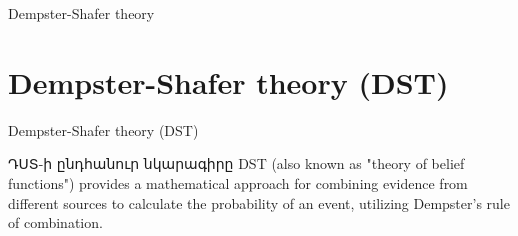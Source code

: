 \documentclass[aspectratio=169]{beamer}
\begin{document}

\begin{frame}
    \begin{center}
        \Huge Dempster-Shafer theory
    \end{center}
\end{frame}

\section{Dempster-Shafer theory (DST)}
\begin{frame}{Dempster-Shafer theory (DST)}
    \begin{block}{ԴՍՏ-ի ընդհանուր նկարագիրը}
        DST (also known as "theory of belief functions") provides a
mathematical approach for combining evidence from different sources to calculate
the probability of an event, utilizing Dempster’s rule of combination. 
        
    \end{block}
\end{frame}
\end{document}
